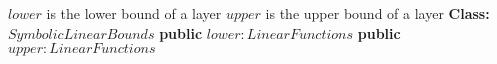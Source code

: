 \begin{algorithm}
	\label{alg:symbolic-linear-bounds}
	\begin{algorithmic}[1]
		\Require $lower$ is the lower bound of a layer
		\Require $upper$ is the upper bound of a layer
		\Statex
		\State \textbf{Class:} $SymbolicLinearBounds$
		\State \quad \textbf{public} $lower: LinearFunctions$
		\State \quad \textbf{public} $upper: LinearFunctions$
	\end{algorithmic}
\end{algorithm}
	
